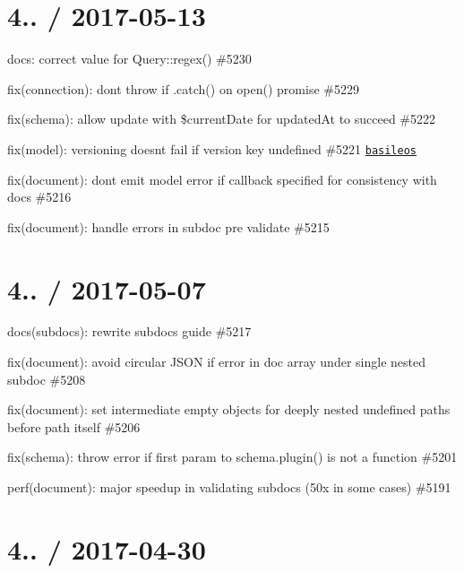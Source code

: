 \section*{4.. / 2017-\/05-\/13 }


\begin{DoxyItemize}
\item docs\+: correct value for Query\+::regex() \#5230
\item fix(connection)\+: don\textquotesingle{}t throw if .catch() on open() promise \#5229
\item fix(schema)\+: allow update with \$current\+Date for updated\+At to succeed \#5222
\item fix(model)\+: versioning doesn\textquotesingle{}t fail if version key undefined \#5221 \href{https://github.com/basileos}{\tt basileos}
\item fix(document)\+: don\textquotesingle{}t emit model error if callback specified for consistency with docs \#5216
\item fix(document)\+: handle errors in subdoc pre validate \#5215
\end{DoxyItemize}

\section*{4.. / 2017-\/05-\/07 }


\begin{DoxyItemize}
\item docs(subdocs)\+: rewrite subdocs guide \#5217
\item fix(document)\+: avoid circular J\+S\+ON if error in doc array under single nested subdoc \#5208
\item fix(document)\+: set intermediate empty objects for deeply nested undefined paths before path itself \#5206
\item fix(schema)\+: throw error if first param to schema.\+plugin() is not a function \#5201
\item perf(document)\+: major speedup in validating subdocs (50x in some cases) \#5191
\end{DoxyItemize}

\section*{4.. / 2017-\/04-\/30 }


